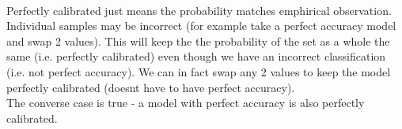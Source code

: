 \begin{answer}\\
Perfectly calibrated just means the probability matches emphirical observation. Individual samples may be incorrect (for example take a perfect accuracy model and swap 2 values). This will keep the the probability of the set as a whole the same (i.e. perfectly calibrated) even though we have an incorrect classification (i.e. not perfect accuracy). We can in fact swap any 2 values to keep the model perfectly calibrated (doesnt have to have perfect accuracy).\\
The converse case is true - a model with perfect accuracy is also perfectly calibrated.
\end{answer}
